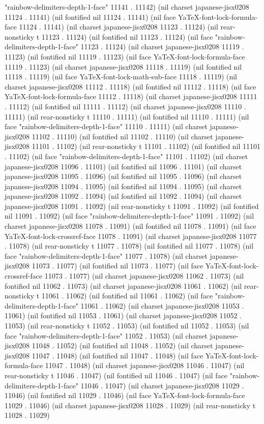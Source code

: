 "rainbow-delimiters-depth-1-face" 11141 . 11142) (nil charset japanese-jisx0208 11124 . 11141) (nil fontified nil 11124 . 11141) (nil face YaTeX-font-lock-formula-face 11124 . 11141) (nil charset japanese-jisx0208 11123 . 11124) (nil rear-nonsticky t 11123 . 11124) (nil fontified nil 11123 . 11124) (nil face "rainbow-delimiters-depth-1-face" 11123 . 11124) (nil charset japanese-jisx0208 11119 . 11123) (nil fontified nil 11119 . 11123) (nil face YaTeX-font-lock-formula-face 11119 . 11123) (nil charset japanese-jisx0208 11118 . 11119) (nil fontified nil 11118 . 11119) (nil face YaTeX-font-lock-math-sub-face 11118 . 11119) (nil charset japanese-jisx0208 11112 . 11118) (nil fontified nil 11112 . 11118) (nil face YaTeX-font-lock-formula-face 11112 . 11118) (nil charset japanese-jisx0208 11111 . 11112) (nil fontified nil 11111 . 11112) (nil charset japanese-jisx0208 11110 . 11111) (nil rear-nonsticky t 11110 . 11111) (nil fontified nil 11110 . 11111) (nil face "rainbow-delimiters-depth-1-face" 11110 . 11111) (nil charset japanese-jisx0208 11102 . 11110) (nil fontified nil 11102 . 11110) (nil charset japanese-jisx0208 11101 . 11102) (nil rear-nonsticky t 11101 . 11102) (nil fontified nil 11101 . 11102) (nil face "rainbow-delimiters-depth-1-face" 11101 . 11102) (nil charset japanese-jisx0208 11096 . 11101) (nil fontified nil 11096 . 11101) (nil charset japanese-jisx0208 11095 . 11096) (nil fontified nil 11095 . 11096) (nil charset japanese-jisx0208 11094 . 11095) (nil fontified nil 11094 . 11095) (nil charset japanese-jisx0208 11092 . 11094) (nil fontified nil 11092 . 11094) (nil charset japanese-jisx0208 11091 . 11092) (nil rear-nonsticky t 11091 . 11092) (nil fontified nil 11091 . 11092) (nil face "rainbow-delimiters-depth-1-face" 11091 . 11092) (nil charset japanese-jisx0208 11078 . 11091) (nil fontified nil 11078 . 11091) (nil face YaTeX-font-lock-crossref-face 11078 . 11091) (nil charset japanese-jisx0208 11077 . 11078) (nil rear-nonsticky t 11077 . 11078) (nil fontified nil 11077 . 11078) (nil face "rainbow-delimiters-depth-1-face" 11077 . 11078) (nil charset japanese-jisx0208 11073 . 11077) (nil fontified nil 11073 . 11077) (nil face YaTeX-font-lock-crossref-face 11073 . 11077) (nil charset japanese-jisx0208 11062 . 11073) (nil fontified nil 11062 . 11073) (nil charset japanese-jisx0208 11061 . 11062) (nil rear-nonsticky t 11061 . 11062) (nil fontified nil 11061 . 11062) (nil face "rainbow-delimiters-depth-1-face" 11061 . 11062) (nil charset japanese-jisx0208 11053 . 11061) (nil fontified nil 11053 . 11061) (nil charset japanese-jisx0208 11052 . 11053) (nil rear-nonsticky t 11052 . 11053) (nil fontified nil 11052 . 11053) (nil face "rainbow-delimiters-depth-1-face" 11052 . 11053) (nil charset japanese-jisx0208 11048 . 11052) (nil fontified nil 11048 . 11052) (nil charset japanese-jisx0208 11047 . 11048) (nil fontified nil 11047 . 11048) (nil face YaTeX-font-lock-formula-face 11047 . 11048) (nil charset japanese-jisx0208 11046 . 11047) (nil rear-nonsticky t 11046 . 11047) (nil fontified nil 11046 . 11047) (nil face "rainbow-delimiters-depth-1-face" 11046 . 11047) (nil charset japanese-jisx0208 11029 . 11046) (nil fontified nil 11029 . 11046) (nil face YaTeX-font-lock-formula-face 11029 . 11046) (nil charset japanese-jisx0208 11028 . 11029) (nil rear-nonsticky t 11028 . 11029) 
